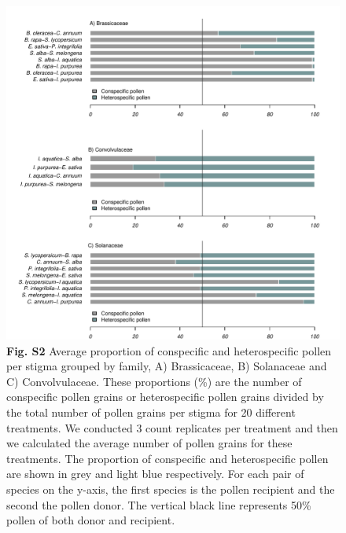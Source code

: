 \documentclass[
  12pt,
]{article}
\begin{document}
\clearpage

\begin{figure}
\centering
\includegraphics{Supp_Material_files/figure-latex/unnamed-chunk-5-1.pdf}
\caption{\textbf{Fig. S2} Average proportion of conspecific and
heterospecific pollen per stigma grouped by family, A) Brassicaceae, B)
Solanaceae and C) Convolvulaceae. These proportions (\%) are the number
of conspecific pollen grains or heterospecific pollen grains divided by
the total number of pollen grains per stigma for 20 different
treatments. We conducted 3 count replicates per treatment and then we
calculated the average number of pollen grains for these treatments. The
proportion of conspecific and heterospecific pollen are shown in grey
and light blue respectively. For each pair of species on the y-axis, the
first species is the pollen recipient and the second the pollen donor.
The vertical black line represents 50\% pollen of both donor and
recipient.}
\end{figure}

\clearpage
\end{document}
